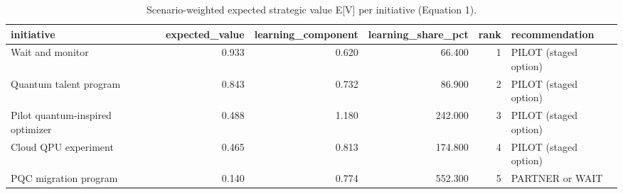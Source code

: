\begin{table}
\caption{Scenario-weighted expected strategic value E[V] per initiative (Equation 1).}
\label{tab:ev}
\begin{tabular}{lrrrrl}
\toprule
initiative & expected\_value & learning\_component & learning\_share\_pct & rank & recommendation \\
\midrule
Wait and monitor & 0.933 & 0.620 & 66.400 & 1 & PILOT (staged option) \\
Quantum talent program & 0.843 & 0.732 & 86.900 & 2 & PILOT (staged option) \\
Pilot quantum-inspired optimizer & 0.488 & 1.180 & 242.000 & 3 & PILOT (staged option) \\
Cloud QPU experiment & 0.465 & 0.813 & 174.800 & 4 & PILOT (staged option) \\
PQC migration program & 0.140 & 0.774 & 552.300 & 5 & PARTNER or WAIT \\
\bottomrule
\end{tabular}
\end{table}
